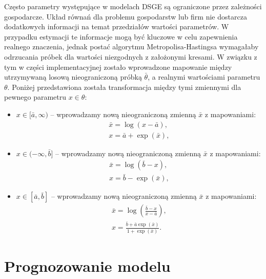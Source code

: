 Często parametry występujące w modelach DSGE są ograniczone przez zależności gospodarcze. Układ równań dla problemu gospodarstw lub firm nie dostarcza dodatkowych informacji na temat przedziałów wartości parametrów. W przypadku estymacji te informacje mogą być kluczowe w celu zapewnienia realnego znaczenia, jednak postać algorytmu Metropolisa-Hastingsa wymagałaby odrzucania próbek dla wartości niezgodnych z założonymi kresami. W związku z tym w części implementacyjnej zostało wprowadzone mapowanie między utrzymywaną losową nieograniczoną próbką $\bar{\theta}$, a realnymi wartościami parametru $\theta$. Poniżej przedstawiona została transformacja między tymi zmiennymi dla pewnego parametru $x \in \theta$:
\begin{itemize}
    \item $x \in [\bar{a}, \infty)$ -- wprowadzamy nową nieograniczoną zmienną $\bar{x}$ z mapowaniami:
        \begin{align}
            \bar{x} = \log{(x - \bar{a})},\\
            x = \bar{a} + \exp{(\bar{x})},
        \end{align}
    \item $x \in (-\infty, \bar{b}]$ -- wprowadzamy nową nieograniczoną zmienną $\bar{x}$ z mapowaniami:
        \begin{align}
            \bar{x} = \log{(\bar{b} - x)},\\
            x = \bar{b} - \exp{(\bar{x})},
        \end{align}
    \item $x \in [\bar{a}, \bar{b}]$ -- wprowadzamy nową nieograniczoną zmienną $\bar{x}$ z mapowaniami:
        \begin{align}
            \bar{x} = \log{\left(\frac{\bar{b} - x}{x - \bar{a}}\right)},\\
            x = \frac{\bar{b} + \bar{a} \exp{(\bar{x})} }{1 + \exp{(\bar{x})}}.
        \end{align}
\end{itemize}

\section{Prognozowanie modelu}

